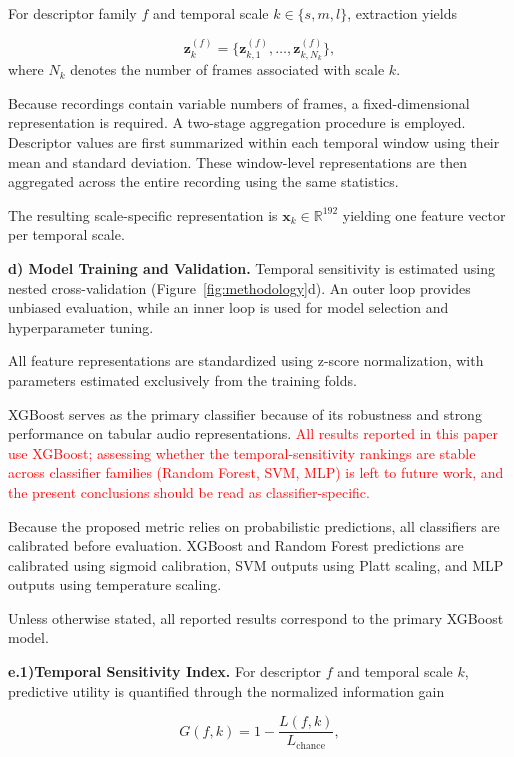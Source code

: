 \documentclass[runningheads]{llncs}
\begin{document}
For descriptor family $f$ and temporal scale $k\in\{s,m,l\}$, extraction yields

\begin{equation}
\mathbf{z}^{(f)}_k=
\{\mathbf{z}^{(f)}_{k,1},\ldots,\mathbf{z}^{(f)}_{k,N_k}\},
\end{equation}
\noindent where $N_k$ denotes the number of frames associated with scale $k$.

Because recordings contain variable numbers of frames, a fixed-dimensional representation is required. A two-stage aggregation procedure is employed. Descriptor values are first summarized within each temporal window using their mean and standard deviation. These window-level representations are then aggregated across the entire recording using the same statistics.

The resulting scale-specific representation is $\mathbf{x}_k \in \mathbb{R}^{192}$ yielding one feature vector per temporal scale.

\textbf{d) Model Training and Validation.} Temporal sensitivity is estimated using nested cross-validation (Figure~\ref{fig:methodology}d). An outer loop provides unbiased evaluation, while an inner loop is used for model selection and hyperparameter tuning.

All feature representations are standardized using z-score normalization, with parameters estimated exclusively from the training folds.

XGBoost serves as the primary classifier because of its robustness and strong performance on tabular audio representations. \textcolor{red}{All results reported in this paper use XGBoost; assessing whether the temporal-sensitivity rankings are stable across classifier families (Random Forest, SVM, MLP) is left to future work, and the present conclusions should be read as classifier-specific.}

Because the proposed metric relies on probabilistic predictions, all classifiers are calibrated before evaluation. XGBoost and Random Forest predictions are calibrated using sigmoid calibration, SVM outputs using Platt scaling, and MLP outputs using temperature scaling.

Unless otherwise stated, all reported results correspond to the primary XGBoost model.

\textbf{e.1)Temporal Sensitivity Index.} For descriptor $f$ and temporal scale $k$, predictive utility is quantified through the normalized information gain

\begin{equation}
G(f,k)=1-\frac{L(f,k)}{L_{\mathrm{chance}}},
\end{equation}
\end{document}
